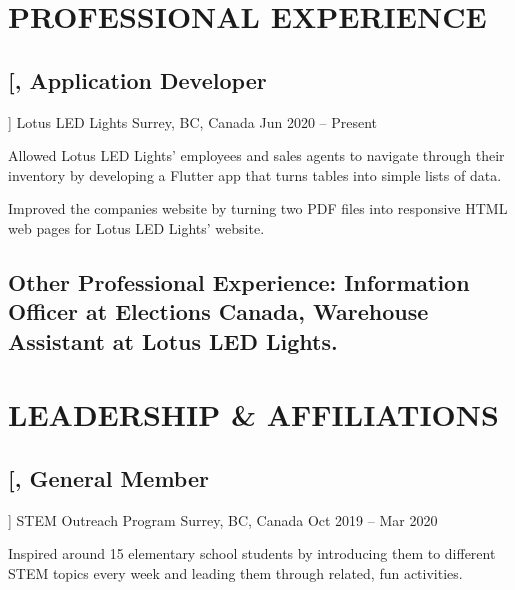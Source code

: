 \documentclass{article}
\newcommand{\datedsubsection}[4][]{
    \subsection*{
        \textbf{\large #2}, #3 \hfill #4
    } %
    \vspace{-4pt} %
    #1 %
}
\begin{document}
{    %
    
    
    
    \section{PROFESSIONAL EXPERIENCE}
    
    
    \datedsubsection
        [\textit{Application Developer}]
        {Lotus LED Lights}
        {Surrey, BC, Canada}
        {Jun 2020 -- Present}
    
    \begin{compactitem}
    \item Allowed Lotus LED Lights' employees and sales agents to navigate through their inventory by developing a Flutter app that turns tables into simple lists of data.
    \item Improved the companies website by turning two PDF files into responsive HTML web pages for Lotus LED Lights' website.
    \end{compactitem}
    
    
    
    \subsection*{\textbf{Other Professional Experience}: Information Officer at Elections Canada, Warehouse Assistant at Lotus LED Lights.}
    
    
    
    
    \section{LEADERSHIP \& AFFILIATIONS}
    
    
    \datedsubsection
        [\textit{General Member}]
        {STEM Outreach Program}
        {Surrey, BC, Canada}
        {Oct 2019 -- Mar 2020}
    
    \begin{compactitem}
    \item Inspired around 15 elementary school students by introducing them to different STEM topics every week and leading them through related, fun activities.
    \end{compactitem}
    
}
\end{document}

